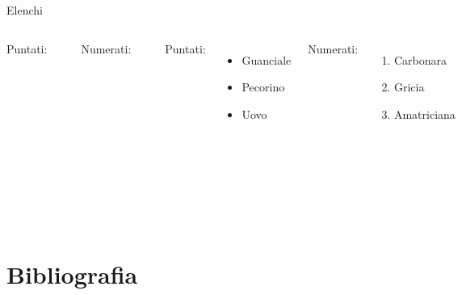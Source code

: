 \documentclass{beamer}
\begin{document}
\begin{frame}[fragile]{Elenchi}
	
	\begin{columns}[T]
			Puntati: 
		
		\begin{verbatim}
			\begin{itemize}
				\item Guanciale
				\item Pecorino
				\item Uovo
			\end{itemize}
		\end{verbatim}
		
		Numerati: 
		
		\begin{verbatim}
			\begin{enumerate}
				\item Carbonara
				\item Gricia
				\item Amatriciana
			\end{enumerate}
		\end{verbatim}
	
		
			Puntati: 
		
		\vspace{5mm}
			\begin{itemize}
				\item Guanciale
				\item Pecorino
				\item Uovo
			\end{itemize}
		
			\vspace{5mm}
		Numerati: 
		\vspace{5mm}
		
			\begin{enumerate}
				\item Carbonara
				\item Gricia
				\item Amatriciana
			\end{enumerate}
	\end{columns}
	

	
	
\end{frame}

\section{Bibliografia}
\end{document}
